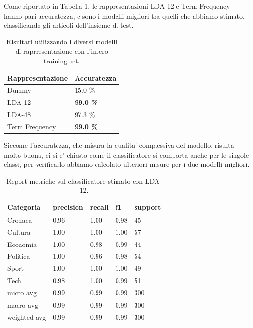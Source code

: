 \documentclass[runningheads]{llncs}
\begin{document}
Come riportato in Tabella 1, le rappresentazioni LDA-12 e Term Frequency hanno pari accuratezza, e sono i modelli migliori tra quelli che abbiamo stimato, classificando gli articoli dell'insieme di test.
\begin{table}[]
    \centering
\begin{tabular}{ll}
\hline
Rappresentazione & Accuratezza      \\ \hline
Dummy            & 15.0 \%          \\
LDA-12           & \textbf{99.0 \%} \\
LDA-48           & 97.3 \%          \\
Term Frequency   & \textbf{99.0 \%} \\ \hline
\end{tabular}
    \caption{Risultati utilizzando i diversi modelli di raprresentazione con l'intero training set.}%
\end{table}
Siccome l'accuratezza, che misura la qualita' complessiva del modello, risulta molto buona, ci si e' chiesto come il classificatore si comporta anche per le singole classi, per verificarlo abbiamo calcolato ulteriori misure per i due modelli migliori.


%




\begin{table}[]
\centering
\begin{tabular}{lllll}
\hline
Categoria    & precision & recall & f1   & support \\ \hline
Cronaca     & 0.96   &   1.00    &  0.98  & 45      \\
Cultura      & 1.00      & 1.00   & 1.00 & 57      \\
Economia     & 1.00      & 0.98   & 0.99 & 44      \\
Politica     & 1.00      & 0.96   & 0.98 & 54      \\
Sport        & 1.00      & 1.00   & 1.00 & 49      \\
Tech         & 0.98      & 1.00   & 0.99 & 51      \\ \hline
micro avg    & 0.99      & 0.99   & 0.99 & 300     \\ \hline
macro avg    & 0.99      & 0.99   & 0.99 & 300     \\ \hline
weighted avg & 0.99      & 0.99   & 0.99 & 300    \\  \hline
\end{tabular}
    \caption{Report metriche sul classificatore stimato con LDA-12.}%

\end{table}
\end{document}
